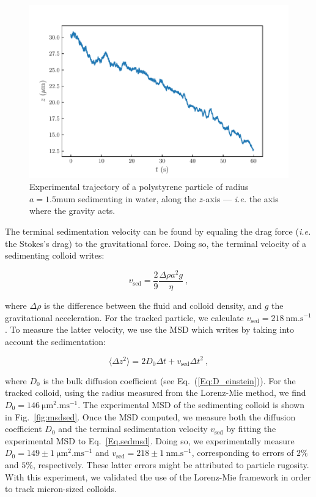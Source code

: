 \begin{figure}[H]
	\centering
	\includegraphics{02_body/chapter2/images/sedimenting/traj_sedimenting.pdf}
	\caption{Experimental trajectory of a polystyrene particle of radius $a = 1.5 \mathrm{mu m}$ sedimenting in water, along the $z$-axis --- \textit{i.e.} the axis where the gravity acts.}
	\label{fig:trajsed}
\end{figure}

The terminal sedimentation velocity can be found by equaling the drag force (\textit{i.e.} the Stokes's drag) to the gravitational force. Doing so, the terminal velocity of a sedimenting colloid writes:

\begin{equation}
	v_\mathrm{sed} = \frac{2}{9} \frac{\Delta \rho a^2 g}{\eta} ~,
\end{equation}

where $\Delta \rho$ is the difference between the fluid and colloid density, and $g$ the gravitational acceleration. For the tracked particle, we calculate $v_\mathrm{sed} = 218 ~\mathrm{nm.s^{-1}}$. To measure the latter velocity, we use the \gls{MSD} which writes by taking into account the sedimentation:

\begin{equation}
	\langle \Delta z ^2 \rangle = 2D_0 \Delta t + v_\mathrm{sed} \Delta t^2 ~,
	\label{Eq.sedmsd}
\end{equation}

where $D_0$ is the bulk diffusion coefficient (see Eq.~(\ref{Eq:D_einstein})). For the tracked colloid, using the radius measured from the Lorenz-Mie method, we find $D_0 = 146 ~\mathrm{\mu m ^2 . ms^{-1}}$. The experimental \gls{MSD} of the sedimenting colloid is shown in Fig.~\ref{fig:msdsed}. Once the \gls{MSD} computed, we measure both the diffusion coefficient $D_0$ and the terminal sedimentation velocity $v_\mathrm{sed}$ by fitting the experimental \gls{MSD} to Eq.~\ref{Eq.sedmsd}. Doing so, we experimentally measure $D_0 = 149 \pm 1 ~ \mathrm{\mu m ^2 . ms^{-1}}$ and $v_\mathrm{sed} = 218 \pm 1 ~ \mathrm{nm.s^{-1}}$, corresponding to errors of $2\%$ and $5\%$, respectively. These latter errors might be attributed to particle rugosity. With this experiment, we validated the use of the Lorenz-Mie framework in order to track micron-sized colloids.

